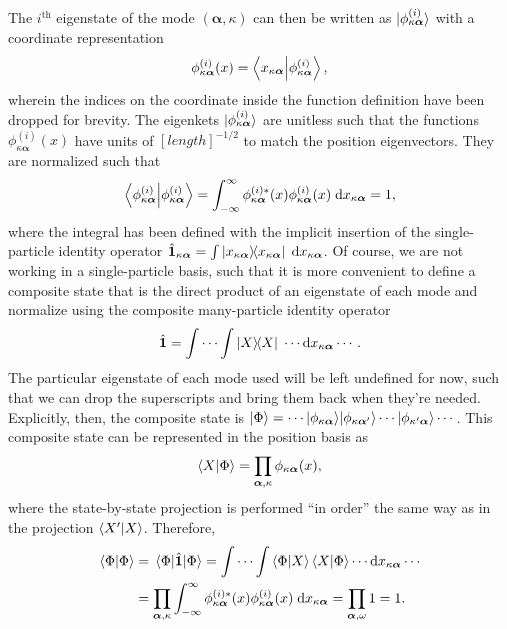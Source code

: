 \documentclass{article}
\numberwithin{equation}{section}
\begin{document}
The $i^\mathrm{th}$ eigenstate of the mode $(\bm{\alpha},\kappa)$ can then be written as $|{\phi^{(i)}_{\kappa\bm{\alpha}}}\rangle$ with a coordinate representation
\begin{equation}
\phi_{\kappa\bm{\alpha}}^{(i)}(x) = \braket{x_{\kappa\bm{\alpha}}}{\phi^{(i)}_{\kappa\bm{\alpha}}},
\end{equation}
wherein the indices on the coordinate inside the function definition have been dropped for brevity. The eigenkets $|{\phi_{\kappa\bm{\alpha}}^{(i)}}\rangle$ are unitless such that the functions $\phi_{\kappa\bm{\alpha}}^{(i)}(x)$ have units of $[length]^{-1/2}$ to match the position eigenvectors. They are normalized such that
\begin{equation}
\braket{\phi_{\kappa\bm{\alpha}}^{(i)}}{\phi_{\kappa\bm{\alpha}}^{(i)}} = \int_{-\infty}^\infty\phi^{(i)*}_{\kappa\bm{\alpha}}(x)\phi^{(i)}_{\kappa\bm{\alpha}}(x)\;\mathrm{d}x_{\kappa\bm{\alpha}} = 1,
\end{equation}
where the integral has been defined with the implicit insertion of the single-particle identity operator $\hat{\bm{1}}_{\kappa\bm{\alpha}} = \int\dyad{x_{\kappa\bm{\alpha}}}{x_{\kappa\bm{\alpha}}}\;\mathrm{d}x_{\kappa\bm{\alpha}}$. Of course, we are not working in a single-particle basis, such that it is more convenient to define a composite state that is the direct product of an eigenstate of each mode and normalize using the composite many-particle identity operator
\begin{equation}
\hat{\bm{1}} = \int\cdots\int\dyad{X}{X}\;\cdots\mathrm{d}x_{\kappa\bm{\alpha}}\cdots.
\end{equation}
The particular eigenstate of each mode used will be left undefined for now, such that we can drop the superscripts and bring them back when they're needed. Explicitly, then, the composite state is $|{\Phi}\rangle = \cdots|{\phi_{\kappa\bm{\alpha}}}\rangle|{\phi_{\kappa\bm{\alpha}'}}\rangle\cdots|{\phi_{\kappa'\bm{\alpha}}}\rangle\cdots$. This composite state can be represented in the position basis as
\begin{equation}
\braket{X}{\Phi} = \prod_{\bm{\alpha},\kappa}\phi_{\kappa\bm{\alpha}}(x),
\end{equation}
where the state-by-state projection is performed ``in order'' the same way as in the projection $\braket{X'}{X}$. Therefore,
\begin{equation}
\begin{split}
\braket{\Phi}{\Phi} &= \mel{\Phi}{\hat{\bm{1}}}{\Phi} = \int\cdots\int\braket{\Phi}{X}\braket{X}{\Phi}\cdots\mathrm{d}x_{\kappa\bm{\alpha}}\cdots\\
&=\prod_{\bm{\alpha},\kappa}\int_{-\infty}^{\infty}\phi^{(i)*}_{\kappa\bm{\alpha}}(x)\phi^{(i)}_{\kappa\bm{\alpha}}(x)\;\mathrm{d}x_{\kappa\bm{\alpha}} = \prod_{\bm{\alpha},\omega}1 = 1.
\end{split}
\end{equation}
\end{document}
